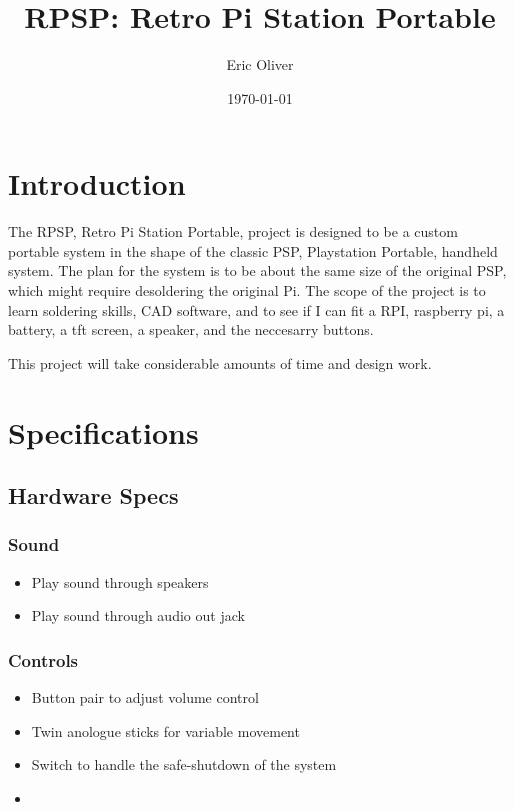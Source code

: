 \documentclass[12pt]{report}
\title{RPSP: Retro Pi Station Portable}
\author{Eric Oliver}
\date{\today}
\begin{document}
\maketitle

\tableofcontents

\chapter{Introduction}

The RPSP, Retro Pi Station Portable, project is designed to be a custom portable system in the shape of the classic PSP, Playstation Portable, handheld system. The plan for the system is to be about the same size of the original PSP, which might require desoldering the original Pi. The scope of the project is to learn soldering skills, CAD software, and to see if I can fit a RPI, raspberry pi, a battery, a tft screen, a speaker, and the neccesarry buttons.

This project will take considerable amounts of time and design work.

\chapter{Specifications}

\section{Hardware Specs}

\subsection{Sound}

\begin{itemize}

    \item Play sound through speakers
    \item Play sound through audio out jack

\end{itemize}

\subsection{Controls}

\begin{itemize}
    
    \item Button pair to adjust volume control
    \item Twin anologue sticks for variable movement
    \item Switch to handle the safe-shutdown of the system
    \item

\end{itemize}
\end{document}
